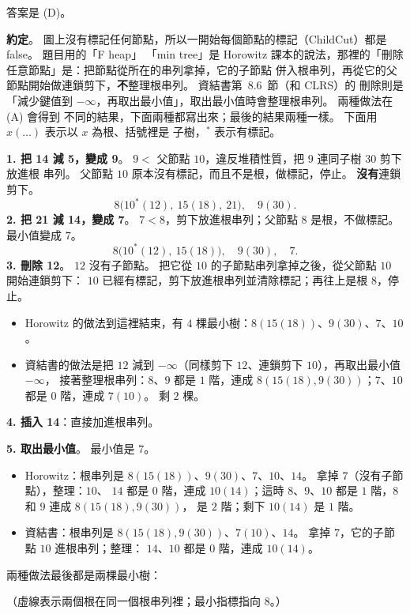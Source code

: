 \begin{pastsoln}
答案是 (D)。

\textbf{約定}。 圖上沒有標記任何節點，所以一開始每個節點的標記（ChildCut）都是 false。 題目用的「F heap」
「min tree」是 Horowitz 課本的說法，那裡的「刪除任意節點」是：把節點從所在的串列拿掉，它的子節點
併入根串列，再從它的父節點開始做連鎖剪下，\textbf{不}整理根串列。 資結書第~8.6~節（和 CLRS）的
刪除則是「減少鍵值到 $-\infty$，再取出最小值」，取出最小值時會整理根串列。 兩種做法在 (A) 會得到
不同的結果，下面兩種都寫出來；最後的結果兩種一樣。 下面用 $x(\ldots)$ 表示以 $x$ 為根、括號裡是
子樹，$^{*}$ 表示有標記。

\textbf{1. 把 14 減 5，變成 9}。 $9 < $ 父節點 $10$，違反堆積性質，把 $9$ 連同子樹 $30$ 剪下放進根
串列。 父節點 $10$ 原本沒有標記，而且不是根，做標記，停止。 \textbf{沒有}連鎖剪下。
\[
8\bigl(10^{*}(12),\ 15(18),\ 21\bigr),\quad 9(30).
\]
\textbf{2. 把 21 減 14，變成 7}。 $7 < 8$，剪下放進根串列；父節點 $8$ 是根，不做標記。 最小值變成 $7$。
\[
8\bigl(10^{*}(12),\ 15(18)\bigr),\quad 9(30),\quad 7.
\]
\textbf{3. 刪除 12}。 $12$ 沒有子節點。 把它從 $10$ 的子節點串列拿掉之後，從父節點 $10$ 開始連鎖剪下：
$10$ 已經有標記，剪下放進根串列並清除標記；再往上是根 $8$，停止。
\begin{itemize}
\item Horowitz 的做法到這裡結束，有 $4$ 棵最小樹：$8(15(18))$、$9(30)$、$7$、$10$。
\item 資結書的做法是把 $12$ 減到 $-\infty$（同樣剪下 $12$、連鎖剪下 $10$），再取出最小值 $-\infty$，
接著整理根串列：$8$、$9$ 都是 $1$ 階，連成 $8(15(18), 9(30))$；$7$、$10$ 都是 $0$ 階，連成 $7(10)$。
剩 $2$ 棵。
\end{itemize}
\textbf{4. 插入 14}：直接加進根串列。

\textbf{5. 取出最小值}。 最小值是 $7$。
\begin{itemize}
\item Horowitz：根串列是 $8(15(18))$、$9(30)$、$7$、$10$、$14$。 拿掉 $7$（沒有子節點），整理：$10$、
$14$ 都是 $0$ 階，連成 $10(14)$；這時 $8$、$9$、$10$ 都是 $1$ 階，$8$ 和 $9$ 連成 $8(15(18), 9(30))$，
是 $2$ 階；剩下 $10(14)$ 是 $1$ 階。
\item 資結書：根串列是 $8(15(18), 9(30))$、$7(10)$、$14$。 拿掉 $7$，它的子節點 $10$ 進根串列；整理：
$14$、$10$ 都是 $0$ 階，連成 $10(14)$。
\end{itemize}
兩種做法最後都是兩棵最小樹：
\begin{center}
\end{center}
（虛線表示兩個根在同一個根串列裡；最小指標指向 $8$。）


\end{pastsoln}
